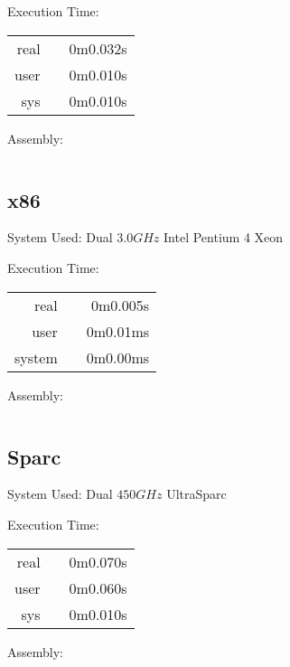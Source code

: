 \documentclass[a4paper,12pt]{article}
\begin{document}
Execution Time:

\begin{tabular}{rrr}
real 	&		&	0m0.032s		\\	
user 	&		&	0m0.010s		\\
sys	&		&	0m0.010s		\\
\end{tabular}

Assembly:

\begin{verbatim}

\end{verbatim}

\subsection*{x86}

System Used: 	Dual $3.0 GHz$ Intel Pentium 4 Xeon

Execution Time:

\begin{tabular}{rrr}
real	&		&	0m0.005s		\\
user	&		&	0m0.01ms 	\\
system&		&	0m0.00ms 	\\
\end{tabular}

Assembly:

\begin{verbatim}

\end{verbatim}


\subsection*{Sparc}

System Used: 	Dual $450 GHz$	UltraSparc

Execution Time:

\begin{tabular}{rrr}
real 	&		&	0m0.070s		\\	
user 	&		&	0m0.060s		\\
sys	&		&	0m0.010s		\\
\end{tabular}

Assembly:

\begin{verbatim}

\end{verbatim}
\end{document}
